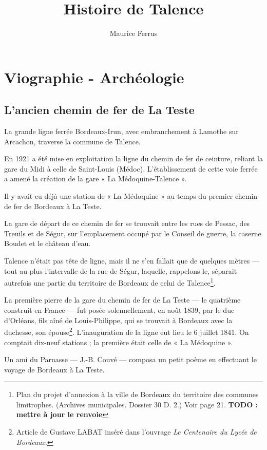 \documentclass[a4paper,11pt]{book}
\begin{document}
\title{Histoire de Talence}
\author{Maurice Ferrus}
\frontmatter
\maketitle

\mainmatter{}

\chapter{Viographie - Archéologie}
\section{L'ancien chemin de fer de La Teste}

La grande ligne ferrée Bordeaux-Irun, avec embranchement à Lamothe sur Arcachon, traverse la commune de Talence.

En 1921 a été mise en exploitation la ligne du chemin de fer de ceinture, reliant la gare du Midi à celle de Saint-Louis (Médoc). L'établissement de cette voie ferrée a amené la création de la gare « La Médoquine-Talence ».

Il y avait eu déjà une station de « La Médoquine » au temps du premier chemin de fer de Bordeaux à La Teste.

La gare de départ de ce chemin de fer se trouvait entre les rues de Pessac, des Treuils et de Ségur, sur l'emplacement occupé par le Conseil de guerre, la caserne Boudet et le château d'eau.

Talence n'était pas tête de ligne, mais il ne s'en fallait que de quelques mètres — tout au plus l'intervalle de la rue de Ségur, laquelle, rappelons-le, séparait autrefois une partie du territoire de Bordeaux de celui de Talence\footnote{Plan du projet d'annexion à la ville de Bordeaux du territoire des communes limitrophes. (Archives municipales. Dossier 30 D. 2.) Voir page 21. \textbf{TODO : mettre à jour le renvoie}}.

La première pierre de la gare du chemin de fer de La Teste — le quatrième construit en France — fut posée solennellement, en août 1839, par le duc d'Orléans, fils aîné de Louis-Philippe, qui se trouvait à Bordeaux avec la duchesse, son épouse\footnote{Article de Gustave \textsc{LABAT} inséré dans l'ouvrage \textit{Le Centenaire du Lycée de Bordeaux}.}. L'inauguration de la ligne eut lieu le 6 juillet 1841. On comptait dix-neuf stations ; la première était celle de « La Médoquine ».

Un ami du Parnasse — J.-B. Couvé — composa un petit poème en effectuant le voyage de Bordeaux à La Teste. 
\end{document}
